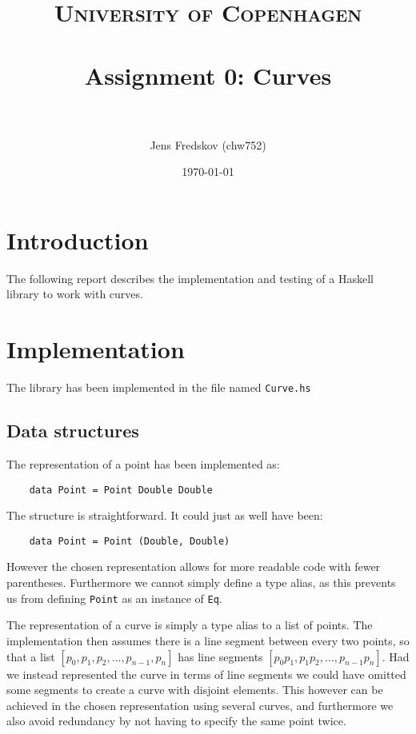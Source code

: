 \documentclass[a4paper, 11pt]{article}
\title{ 
\normalfont\normalsize 
\textsc{University of Copenhagen} \\ [25pt] %
\horrule{0.5pt} \\[0.4cm] %
\huge Assignment 0: Curves \\ %
\horrule{2pt} \\[0.5cm] %
}
\author{Jens Fredskov (chw752)} %
\date{\normalsize\today} %
\begin{document}
\maketitle

\section{Introduction} %
\label{sec:introduction}
The following report describes the implementation and testing of a Haskell library to work with curves.

\section{Implementation} %
\label{sec:implementation}
The library has been implemented in the file named \texttt{Curve.hs}

\subsection{Data structures} %
\label{sub:data_structures}
The representation of a point has been implemented as:

\begin{verbatim}
    data Point = Point Double Double
\end{verbatim}

The structure is straightforward. It could just as well have been:

\begin{verbatim}
    data Point = Point (Double, Double)
\end{verbatim}

However the chosen representation allows for more readable code with fewer parentheses. Furthermore we cannot simply define a type alias, as this prevents us from defining \texttt{Point} as an instance of \texttt{Eq}.

The representation of a curve is simply a type alias to a list of points. The implementation then assumes there is a line segment between every two points, so that a list $[p_0, p_1, p_2, \ldots , p_{n-1}, p_n]$ has line segments $[p_0 p_1, p_1 p_2, \ldots , p_{n-1} p_n ]$. Had we instead represented the curve in terms of line segments we could have omitted some segments to create a curve with disjoint elements. This however can be achieved in the chosen representation using several curves, and furthermore we also avoid redundancy by not having to specify the same point twice.
\end{document}
